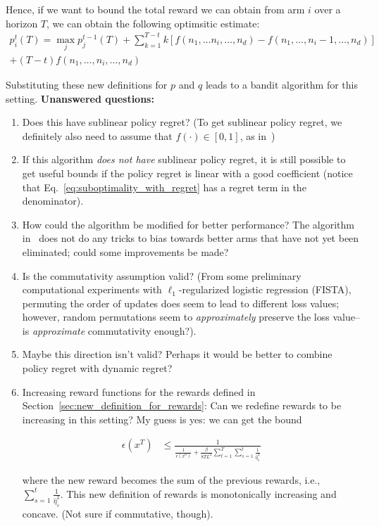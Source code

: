 \documentclass[letterpaper]{article}
\begin{document}
Hence, if we want to bound the total reward we can obtain from arm $i$ over a horizon $T$, we can obtain the following optimsitic estimate:
\begin{align}
    p_i^t(T) = \max_j p_j^{t-1}(T) + \sum_{k=1}^{T-t} k \left[f(n_1,\ldots n_i,\ldots, n_d) - f(n_1,\ldots, n_i-1,\ldots, n_d)\right] \\+ (T-t) f(n_1,\ldots, n_i,\ldots, n_d)
\end{align}

Substituting these new definitions for $p$ and $q$ leads to a bandit algorithm for this setting. \textbf{Unanswered questions:}
\begin{enumerate}
\item Does this have sublinear policy regret? (To get sublinear policy regret, we definitely also need to assume that $f(\cdot) \in [0,1]$, as in~\cite{heidari2016tight_policy_regret})
\item If this algorithm \emph{does not have} sublinear policy regret, it is still possible to get useful bounds if the policy regret is linear with a good coefficient (notice that Eq.~\ref{eq:suboptimality_with_regret} has a regret term in the denominator).
\item How could the algorithm be modified for better performance? The algorithm in~\cite{heidari2016tight_policy_regret} does not do any tricks to bias towards better arms that have not yet been eliminated; could some improvements be made?
\item Is the commutativity assumption valid? (From some preliminary computational experiments with $\ell_1$-regularized logistic regression (FISTA), permuting the order of updates does seem to lead to different loss values; however, random permutations seem to \emph{approximately} preserve the loss value--is \emph{approximate} commutativity enough?). 
\item Maybe this direction isn't valid? Perhaps it would be better to combine policy regret with dynamic regret?
\item Increasing reward functions for the rewards defined in Section~\ref{sec:new_definition_for_rewards}: Can we redefine rewards to be increasing in this setting? My guess is yes: we can get the bound

\begin{align}
    \epsilon(x^T) &\leq \frac{1}{\frac{1}{\epsilon(x^0)}  + \frac{\beta}{8TL^2} \sum_{t=1}^T\sum_{s=1}^t \frac{1}{\hat{\eta}_s^2}}
\end{align}

where the new reward becomes the sum of the previous rewards, i.e., $\sum_{s=1}^t \frac{1}{\hat{\eta}_s^2}$. This new definition of rewards is monotonically increasing and concave. (Not sure if commutative, though).
\end{enumerate}
\end{document}
